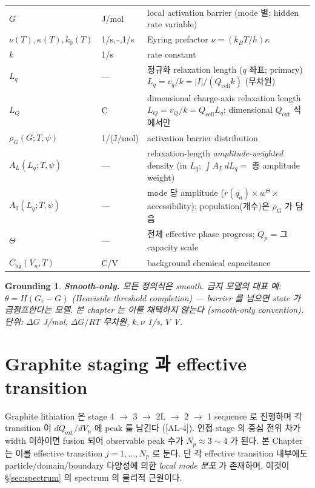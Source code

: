 \documentclass[11pt,a4paper]{article}
\newtheorem*{groundingbox}{Grounding}
\newcommand{\bg}{\mathrm{bg}}
\newcommand{\cell}{\mathrm{cell}}
\newcommand{\ext}{\mathrm{ext}}
\newcommand{\AL}[1]{\textsf{[AL-#1]}}
\begin{document}
\begin{longtable}{p{} p{} p{}}
$G$ & J/mol & local activation barrier (mode 별; hidden rate variable) \\
$\nu(T),\kappa(T),k_0(T)$ & 1/s,--,1/s & Eyring prefactor $\nu=(k_BT/h)\kappa$ \\
$k$ & 1/s & rate constant \\
$L_q$ & --- & 정규화 relaxation length ($q$ 좌표; primary) $L_q=v_q/k=|I|/(Q_\cell k)$ (무차원) \\
$L_Q$ & C & dimensional charge-axis relaxation length $L_Q=v_Q/k=Q_\cell L_q$; dimensional $Q_\ext$ 식에서만 \\
$\rho_G(G;T,\psi)$ & 1/(J/mol) & activation barrier distribution \\
$A_L(L_q;T,\psi)$ & --- & relaxation-length \emph{amplitude-weighted} density (in $L_q$; $\int A_L\,dL_q=$ 총 amplitude weight) \\
$A_0(L_q;T,\psi)$ & --- & mode 당 amplitude ($r(q_a)\times w^\Theta\times$ accessibility); population(개수)은 $\rho_G$ 가 담음 \\
$\Theta$ & --- & 전체 effective phase progress; $Q_p$ = 그 capacity scale \\
$C_\bg(V_n,T)$ & C/V & background chemical capacitance \\
\bottomrule
\end{longtable}
\begin{groundingbox}
\textbf{Smooth-only.} 모든 정의식은 smooth. 금지 모델의 대표 예: $\theta=H(G_c-G)$
(Heaviside threshold completion) — barrier 를 넘으면 state 가 급점프한다는 모델. 본 chapter
는 이를 채택하지 않는다 (smooth-only convention). 단위: $\Delta G$ J/mol, $\Delta G/RT$
무차원, $k,\nu$ 1/s, $V$ V.
\end{groundingbox}

\section{Graphite staging 과 effective transition}\label{sec:staging}
Graphite lithiation 은 stage 4 $\to$ 3 $\to$ 2L $\to$ 2 $\to$ 1 sequence 로 진행하며 각
transition 이 $dQ_\ext/dV_n$ 에 peak 를 남긴다 \cite{dahn1991,ohzuku1993,funabiki1999} (\AL{4}).
인접 stage 의 중심 전위 차가 width 이하이면 fusion 되어 observable peak 수가 $N_p\approx
3\sim4$ 가 된다. 본 Chapter 는 이를 effective transition $j=1,\dots,N_p$ 로 둔다. 단 각
effective transition 내부에도 particle/domain/boundary 다양성에 의한 \emph{local mode 분포}
가 존재하며, 이것이 \S\ref{sec:spectrum} 의 spectrum 의 물리적 근원이다.
\end{document}
